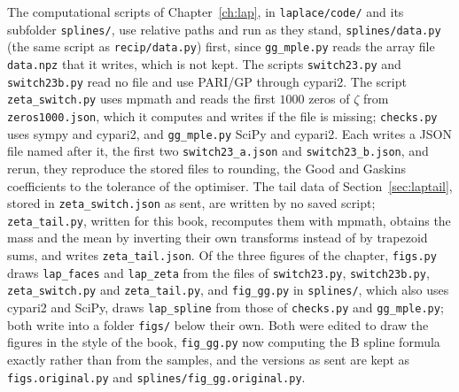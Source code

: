 The computational scripts of Chapter~\ref{ch:lap}, in \texttt{laplace/code/} and its subfolder \texttt{splines/}, use relative paths and run as they stand, \texttt{splines/data.py} (the same script as \texttt{recip/data.py}) first, since \texttt{gg\_mple.py} reads the array file \texttt{data.npz} that it writes, which is not kept. The scripts \texttt{switch23.py} and \texttt{switch23b.py} read no file and use PARI/GP through cypari2. The script \texttt{zeta\_switch.py} uses mpmath and reads the first $1000$ zeros of $\zeta$ from \texttt{zeros1000.json}, which it computes and writes if the file is missing; \texttt{checks.py} uses sympy and cypari2, and \texttt{gg\_mple.py} SciPy and cypari2. Each writes a JSON file named after it, the first two \texttt{switch23\_a.json} and \texttt{switch23\_b.json}, and rerun, they reproduce the stored files to rounding, the Good and Gaskins coefficients to the tolerance of the optimiser. The tail data of Section~\ref{sec:laptail}, stored in \texttt{zeta\_switch.json} as sent, are written by no saved script; \texttt{zeta\_tail.py}, written for this book, recomputes them with mpmath, obtains the mass and the mean by inverting their own transforms instead of by trapezoid sums, and writes \texttt{zeta\_tail.json}. Of the three figures of the chapter, \texttt{figs.py} draws \texttt{lap\_faces} and \texttt{lap\_zeta} from the files of \texttt{switch23.py}, \texttt{switch23b.py}, \texttt{zeta\_switch.py} and \texttt{zeta\_tail.py}, and \texttt{fig\_gg.py} in \texttt{splines/}, which also uses cypari2 and SciPy, draws \texttt{lap\_spline} from those of \texttt{checks.py} and \texttt{gg\_mple.py}; both write into a folder \texttt{figs/} below their own. Both were edited to draw the figures in the style of the book, \texttt{fig\_gg.py} now computing the B spline formula exactly rather than from the samples, and the versions as sent are kept as \texttt{figs.original.py} and \texttt{splines/fig\_gg.original.py}.

